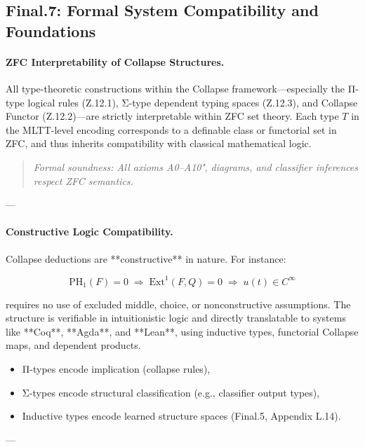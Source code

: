 \documentclass[11pt]{article}
\begin{document}
\begin{axiom}
\begin{axiom}
{{\subsection*{Final.7: Formal System Compatibility and Foundations}

\paragraph{ZFC Interpretability of Collapse Structures.}  
All type-theoretic constructions within the Collapse framework—especially the Π-type logical rules (Z.12.1),  
Σ-type dependent typing spaces (Z.12.3), and Collapse Functor (Z.12.2)—are strictly interpretable within ZFC set theory.  
Each type \( T \) in the MLTT-level encoding corresponds to a definable class or functorial set in ZFC,  
and thus inherits compatibility with classical mathematical logic.  

\begin{quote}
\textit{Formal soundness: All axioms A0–A10⁺, diagrams, and classifier inferences respect ZFC semantics.}
\end{quote}

---

\paragraph{Constructive Logic Compatibility.}  
Collapse deductions are **constructive** in nature. For instance:

\[
\mathrm{PH}_1(F) = 0 \;\Rightarrow\; \mathrm{Ext}^1(F,Q) = 0 \;\Rightarrow\; u(t) \in C^\infty
\]

requires no use of excluded middle, choice, or nonconstructive assumptions.  
The structure is verifiable in intuitionistic logic and directly translatable to systems like **Coq**, **Agda**, and **Lean**,  
using inductive types, functorial Collapse maps, and dependent products.

\begin{itemize}
  \item Π-types encode implication (collapse rules),
  \item Σ-types encode structural classification (e.g., classifier output types),
  \item Inductive types encode learned structure spaces (Final.5, Appendix L.14).
\end{itemize}

---

}}
\end{axiom}
\end{axiom}
\end{document}
